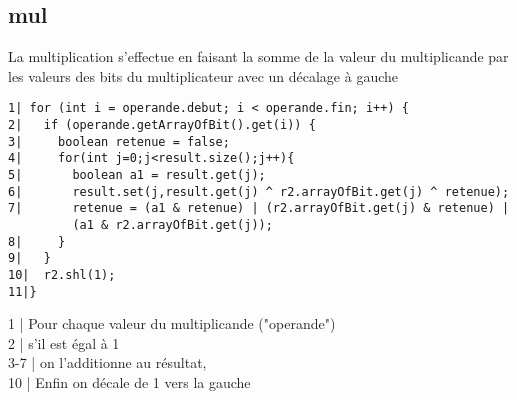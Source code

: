 \documentclass{article}
\begin{document}
\subsection{mul}
La multiplication s'effectue en faisant la somme de la valeur du multiplicande par les valeurs des bits du multiplicateur avec un décalage à gauche
\begin{verbatim}
1| for (int i = operande.debut; i < operande.fin; i++) {
2|   if (operande.getArrayOfBit().get(i)) {
3|     boolean retenue = false;
4|     for(int j=0;j<result.size();j++){
5|       boolean a1 = result.get(j);
6|       result.set(j,result.get(j) ^ r2.arrayOfBit.get(j) ^ retenue);
7|       retenue = (a1 & retenue) | (r2.arrayOfBit.get(j) & retenue) |
         (a1 & r2.arrayOfBit.get(j));
8|     }
9|   }
10|  r2.shl(1);
11|}
\end{verbatim}
1 | Pour chaque valeur du multiplicande ("operande")\\
2 | s'il est égal à 1\\
3-7 | on l'additionne au résultat,\\
10 | Enfin on décale de 1 vers la gauche\\
\end{document}
